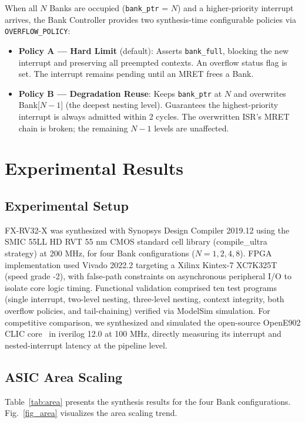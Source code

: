 \documentclass[conference]{IEEEtran}
\begin{document}
When all $N$ Banks are occupied (\texttt{bank\_ptr} = $N$) and a higher-priority interrupt arrives, the Bank Controller provides two synthesis-time configurable policies via \texttt{OVERFLOW\_POLICY}:

\begin{itemize}
\item \textbf{Policy A --- Hard Limit} (default): Asserts \texttt{bank\_full}, blocking the new interrupt and preserving all preempted contexts. An overflow status flag is set. The interrupt remains pending until an MRET frees a Bank.
\item \textbf{Policy B --- Degradation Reuse}: Keeps \texttt{bank\_ptr} at $N$ and overwrites Bank[$N-1$] (the deepest nesting level). Guarantees the highest-priority interrupt is always admitted within 2 cycles. The overwritten ISR's MRET chain is broken; the remaining $N-1$ levels are unaffected.
\end{itemize}

\section{Experimental Results}

\subsection{Experimental Setup}

FX-RV32-X was synthesized with Synopsys Design Compiler 2019.12 using the SMIC 55LL HD RVT 55 nm CMOS standard cell library (compile\_ultra strategy) at 200 MHz, for four Bank configurations ($N = 1, 2, 4, 8$).
FPGA implementation used Vivado 2022.2 targeting a Xilinx Kintex-7 XC7K325T (speed grade -2), with false-path constraints on asynchronous peripheral I/O to isolate core logic timing.
Functional validation comprised ten test programs (single interrupt, two-level nesting, three-level nesting, context integrity, both overflow policies, and tail-chaining) verified via ModelSim simulation.
For competitive comparison, we synthesized and simulated the open-source OpenE902 CLIC core~\cite{ref4} in iverilog 12.0 at 100 MHz, directly measuring its interrupt and nested-interrupt latency at the pipeline level.

\subsection{ASIC Area Scaling}

Table~\ref{tab:area} presents the synthesis results for the four Bank configurations.
Fig.~\ref{fig_area} visualizes the area scaling trend.
\end{document}
